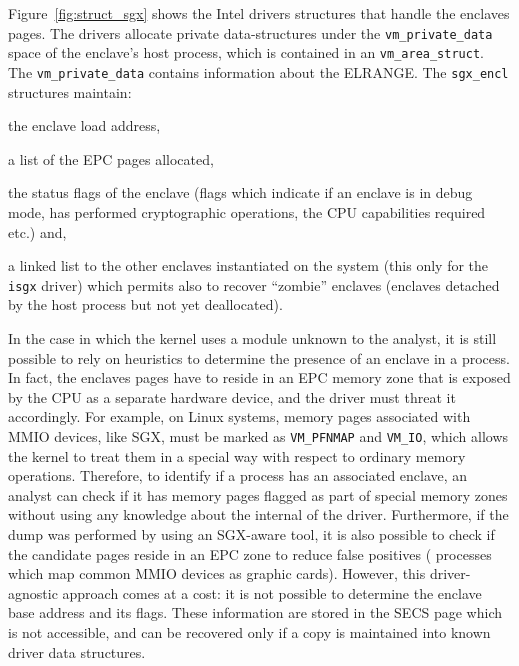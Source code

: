 Figure~\ref{fig:struct_sgx} shows the Intel drivers structures that handle the
enclaves pages. The drivers allocate private data-structures under the
\texttt{vm\_private\_data} space of the enclave's host process, which is
contained in an \texttt{vm\_area\_struct}. \newline
The \texttt{vm\_private\_data} contains information about the ELRANGE. The
\texttt{sgx\_encl} structures maintain:
\begin{enumerate*}[label=(\roman*)]
	\item the enclave load address,
	\item a list of the EPC pages allocated,
	\item the status flags of the enclave (\eg flags which indicate if an
	enclave is in debug mode, has performed cryptographic operations, the CPU
	capabilities required etc.) and,
	\item a linked list to the other enclaves instantiated on the system (this
	only for the \texttt{isgx} driver) which permits also to recover ``zombie''
	enclaves (\ie enclaves detached by the host process but not yet
	deallocated).
\end{enumerate*}

\vspace{0.2cm}
In the case in which the kernel uses a module unknown to the analyst, it is 
still possible
to rely on heuristics to determine the presence of an enclave in a process. In 
fact, the
enclaves pages have to reside in an EPC memory zone that is exposed by the CPU
as a separate hardware device, and the driver must threat it accordingly. For
example, on Linux systems, memory pages associated with MMIO devices, like SGX,
must be marked as \texttt{VM\_PFNMAP} and \texttt{VM\_IO}, which allows the
kernel to treat them in a special way with respect to ordinary memory 
operations. 
Therefore, to identify if a process has an associated
enclave, an analyst can check if it has memory pages flagged as part of special 
memory
zones without using any knowledge about the internal of the driver. Furthermore,
if the dump was performed by using an SGX-aware tool, it is also possible to
check if the candidate pages reside in an EPC zone to reduce false positives 
(\eg
processes which map common MMIO devices as graphic cards). However, this 
driver-agnostic
approach comes at a cost: it is not possible to determine the enclave base
address and its flags. These information are stored in the SECS page which is
not accessible, and can be recovered only if 
a copy is maintained into known driver data structures.

